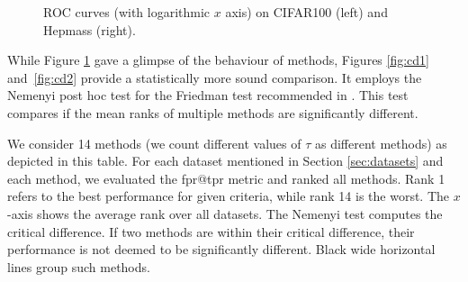 \begin{figure}[!ht]
  \centering
  \caption{ROC curves (with logarithmic $x$ axis) on CIFAR100 (left) and Hepmass (right).}
  \label{fig:ptau}
\end{figure}

While Figure \ref{fig:ptau} gave a glimpse of the behaviour of methods, Figures \ref{fig:cd1} and~\ref{fig:cd2} provide a statistically more sound comparison. It employs the Nemenyi post hoc test for the Friedman test recommended in \cite{demvsar2006statistical}. This test compares if the mean ranks of multiple methods are significantly different.

We consider 14 methods (we count different values of $\tau$ as different methods) as depicted in this table. For each dataset mentioned in Section \ref{sec:datasets} and each method, we evaluated the fpr@tpr metric and ranked all methods. Rank 1 refers to the best performance for given criteria, while rank 14 is the worst. The $x$-axis shows the average rank over all datasets. The Nemenyi test computes the critical difference. If two methods are within their critical difference, their performance is not deemed to be significantly different. Black wide horizontal lines group such methods.

